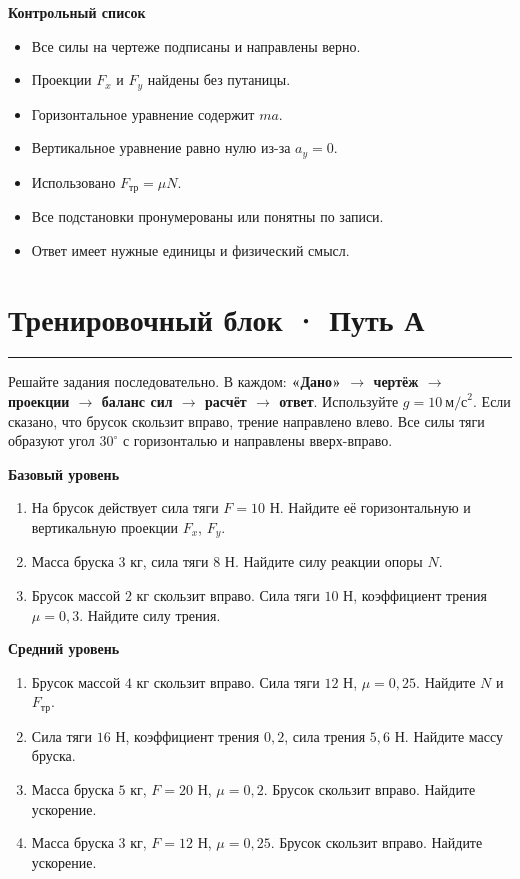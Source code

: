 \documentclass[a4paper,12pt]{article}
\newcommand{\ruleline}{\par\vspace{2pt}\noindent\textcolor{accent}{\rule{\linewidth}{0.55pt}}\par\vspace{1pt}}
\newcommand{\subname}[1]{\vspace{0.3em}\textcolor{darkaccent}{\bfseries #1}\par\vspace{-0.2em}}
\begin{document}
\subname{Контрольный список}
\begin{itemize}
\item[$\square$] Все силы на чертеже подписаны и направлены верно.
\item[$\square$] Проекции $F_x$ и $F_y$ найдены без путаницы.
\item[$\square$] Горизонтальное уравнение содержит $ma$.
\item[$\square$] Вертикальное уравнение равно нулю из-за $a_y=0$.
\item[$\square$] Использовано $F_{\text{тр}}=\mu N$.
\item[$\square$] Все подстановки пронумерованы или понятны по записи.
\item[$\square$] Ответ имеет нужные единицы и физический смысл.
\end{itemize}

\clearpage
\section*{Тренировочный блок · Путь А}
\ruleline
Решайте задания последовательно. В каждом: \textbf{«Дано» $\to$ чертёж $\to$ проекции $\to$ баланс сил $\to$ расчёт $\to$ ответ}. Используйте $g=10\ \text{м/с}^2$. Если сказано, что брусок скользит вправо, трение направлено влево. Все силы тяги образуют угол $30^\circ$ с горизонталью и направлены вверх-вправо.

\subname{Базовый уровень}
\begin{enumerate}
\item На брусок действует сила тяги $F=10$ Н. Найдите её горизонтальную и вертикальную проекции $F_x$, $F_y$.
\item Масса бруска $3$ кг, сила тяги $8$ Н. Найдите силу реакции опоры $N$.
\item Брусок массой $2$ кг скользит вправо. Сила тяги $10$ Н, коэффициент трения $\mu=0{,}3$. Найдите силу трения.
\end{enumerate}

\subname{Средний уровень}
\begin{enumerate}[resume]
\item Брусок массой $4$ кг скользит вправо. Сила тяги $12$ Н, $\mu=0{,}25$. Найдите $N$ и $F_{\text{тр}}$.
\item Сила тяги $16$ Н, коэффициент трения $0{,}2$, сила трения $5{,}6$ Н. Найдите массу бруска.
\item Масса бруска $5$ кг, $F=20$ Н, $\mu=0{,}2$. Брусок скользит вправо. Найдите ускорение.
\item Масса бруска $3$ кг, $F=12$ Н, $\mu=0{,}25$. Брусок скользит вправо. Найдите ускорение.
\end{enumerate}
\end{document}

